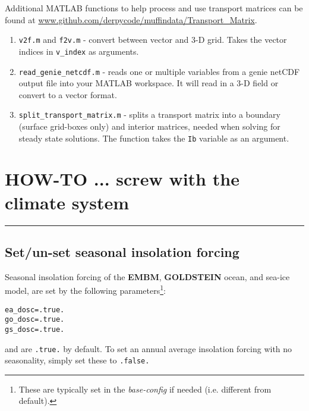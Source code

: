 Additional MATLAB functions to help process and use transport matrices can be found at \url{www.github.com/derpycode/muffindata/Transport_Matrix}.

\vspace{2mm}
\begin{enumerate}
\item \texttt{v2f.m} and \texttt{f2v.m} - convert between vector and 3-D grid. Takes the vector indices in \texttt{v\_index} as arguments.
\item \texttt{read\_genie\_netcdf.m} - reads one or multiple variables from a genie netCDF output file into your MATLAB workspace. It will read in a 3-D field or convert to a vector format.
\item \texttt{split\_transport\_matrix.m} - splits a transport matrix into a boundary (surface grid-boxes only) and interior matrices, needed when solving for steady state solutions. The function takes the \texttt{Ib} variable as an argument.
\end{enumerate}
\vspace{2mm}


\newpage


\section{HOW-TO ... screw with the climate system}
\vspace{2mm}

\noindent\rule{4cm}{0.5pt}

%
\newpage
\subsection*{Set/un-set seasonal insolation forcing}
\vspace{1mm}

Seasonal insolation forcing of the \textbf{EMBM}, \textbf{GOLDSTEIN} ocean, and sea-ice model, are set by the following parameters\footnote{These are typically set in the \textit{base-config} if needed (i.e. different from default).}:
\vspace{-1mm}\small\begin{verbatim}
ea_dosc=.true.
go_dosc=.true.
gs_dosc=.true.
\end{verbatim}\normalsize\vspace{-1mm}
and are \texttt{.true.} by default.
To set an annual average insolation forcing with no seasonality, simply set these to \texttt{.false.}

